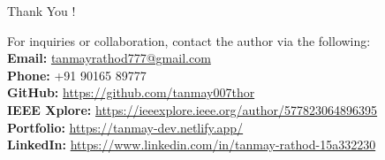 \begin{frame}{Thank You !}
	\begin{block}{}
		For inquiries or collaboration, contact the author via the following: \\
		
		\textbf{Email:} \href{mailto:tanmayrathod777@gmail.com}{tanmayrathod777@gmail.com} \\
		\textbf{Phone:} +91 90165 89777 \\
		\textbf{GitHub:} \url{https://github.com/tanmay007thor} \\
		\textbf{IEEE Xplore:} \url{https://ieeexplore.ieee.org/author/577823064896395} \\
		\textbf{Portfolio:} \url{https://tanmay-dev.netlify.app/} \\
		\textbf{LinkedIn:} \url{https://www.linkedin.com/in/tanmay-rathod-15a332230}
	\end{block}
\end{frame}

